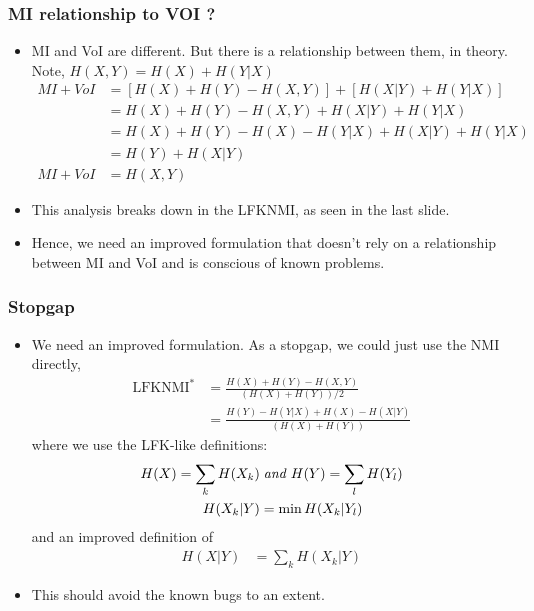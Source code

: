 \documentclass{beamer}
\begin{document}
\frame
{
  \frametitle{ MI relationship to VOI ? }

  \begin{itemize}
	\item MI and VoI are different. But there is a relationship between them, in theory. Note, $H(X,Y) = H(X) + H(Y|X)$
		\begin{align*}
				MI + VoI &= \left[ H(X) + H(Y) - H(X,Y) \right] + \left[ H(X|Y) + H(Y|X) \right]        \\
				 &= H(X) + H(Y) - H(X,Y) + H(X|Y) + H(Y|X)                                              \\
				 &= H(X) + H(Y) - H(X) - H(Y|X) + H(X|Y) + H(Y|X)                                       \\
				 &=        H(Y)                 + H(X|Y)                                                \\
			MI + VoI 	 &= H(X,Y)
		\end{align*}
	\item This analysis breaks down in the LFKNMI, as seen in the last slide.
	\item Hence, we need an improved formulation that doesn't rely on a relationship between MI and VoI and is conscious of known problems.
  \end{itemize}
}

\frame
{
  \frametitle{ Stopgap }

  \begin{itemize}
	\item We need an improved formulation. As a stopgap, we could just use the NMI directly,
		\begin{align*}
			\text{LFKNMI}^* &= \frac { H(X) + H(Y) - H(X,Y) } { \left( H(X) + H(Y) \right ) /2 }                   \\
			                &= \frac { H(Y) - H(Y|X) + H(X) - H(X|Y) } { \left( H(X) + H(Y) \right )  }                  
		\end{align*}
 	where we use the LFK-like definitions:
		\begin{align*}
			H(X) = \sum_k H(X_k)   & \; \text{\emph{and}} \;         H(Y) = \sum_l H(Y_l)            \\
			H(X_k|Y) &= \min H(X_k|Y_l)
		\end{align*}
	and an improved definition of
		\begin{align*}
			H(X|Y) &= \sum_k H(X_k|Y)
		\end{align*}
	\item This should avoid the known bugs to an extent.
  \end{itemize}
}
\end{document}
